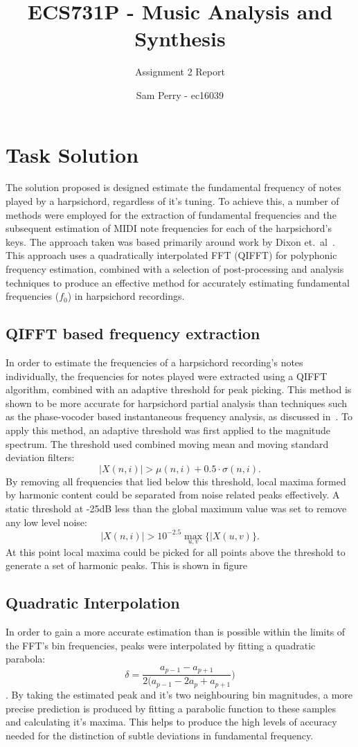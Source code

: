 \documentclass[titlepage]{scrartcl}
\begin{document}
\title{ECS731P - Music Analysis and Synthesis}
\subtitle{\LARGE{Assignment 2 Report}}
\author{Sam Perry - ec16039}

\maketitle
\section{Task Solution}
The solution proposed is designed estimate the fundamental frequency of notes
played by a harpsichord, regardless of it's tuning. To achieve this, a number
of methods were employed for the extraction of fundamental frequencies and the
subsequent estimation of MIDI note frequencies for each of the harpsichord's
keys. The approach taken was based primarily around work by Dixon et.\ 
al~\citeyearpar{Dixon2012}.
This approach uses a quadratically interpolated FFT (QIFFT) for polyphonic
frequency estimation, combined with a selection of post-processing and analysis
techniques to produce an effective method for accurately estimating fundamental
frequencies ($f_0$) in harpsichord recordings.

\subsection{QIFFT based frequency extraction}
In order to estimate the frequencies of a harpsichord recording's notes
individually, the frequencies for notes played were extracted using a QIFFT
algorithm, combined with an adaptive threshold for peak picking.
This method is shown to be more accurate for harpsichord partial analysis than
techniques such as the phase-vocoder based instantaneous frequency analysis, as
discussed in~\parencite{Tidhar2010}. 
To apply this method, an adaptive threshold was first applied to the magnitude
spectrum. The threshold used combined moving mean and moving standard
deviation filters:
$$\lvert X(n,i) \rvert > \mu(n,i) + 0.5 \cdot \sigma(n,i).$$
By removing all frequencies that lied below this threshold, local maxima formed
by harmonic content could be separated from noise related peaks effectively. A
static threshold at -25dB less than the global maximum value was set to remove
any low level noise:
$$\lvert X(n,i) \rvert > 10^{-2.5}\max_{u,v}\{\lvert X(u,v)\}.$$
At this point local maxima could be picked for all points above the threshold
to generate a set of harmonic peaks. This is shown in figure

\subsection{Quadratic Interpolation}
In order to gain a more accurate estimation than is possible within the limits
of the FFT's bin frequencies, peaks were interpolated by fitting a quadratic
parabola:
$$\delta = \frac{a_{p-1}-a_{p+1}}{2(a_{p-1}-2a_p+a_{p+1}})$$.
By taking the estimated peak and it's two neighbouring bin magnitudes, a
more precise prediction is produced by fitting a parabolic function to these
samples and calculating it's maxima. This helps to produce the high levels of
accuracy needed for the distinction of subtle deviations in fundamental
frequency.
\end{document}

